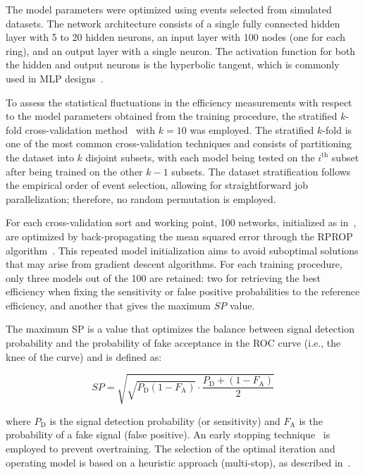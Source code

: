 The model parameters were optimized using events selected from simulated \Zee datasets. The network architecture consists of a single fully connected hidden layer with 5 to 20 hidden neurons, an input layer with 100 nodes (one for each ring), and an output layer with a single neuron.
The activation function for both the hidden and output neurons is the hyperbolic tangent, which is commonly used in MLP designs~\cite{haykin_2008}.


To assess the statistical fluctuations in the efficiency measurements with respect to the model parameters obtained from the training procedure, the stratified $k$-fold cross-validation method~\cite{haykin_2008} with $k=10$ was employed. The stratified $k$-fold is one of the most common cross-validation techniques and consists of partitioning the dataset into $k$ disjoint subsets, with each model being tested on the $i^\text{th}$ subset after being trained on the other $k-1$ subsets. The dataset stratification follows the empirical order of event selection, allowing for straightforward job parallelization; therefore, no random permutation is employed. 

For each cross-validation sort and working point, 100 networks, initialized as in~\cite{initnw}, are optimized by back-propagating the mean squared error through the RPROP algorithm~\cite{rprop}. This repeated model initialization aims to avoid suboptimal solutions that may arise from gradient descent algorithms.
For each training procedure, only three models out of the 100 are retained: two for retrieving the best efficiency when fixing the sensitivity or false positive probabilities to the reference \fastcalo{} efficiency, and another that gives the maximum $SP$ value. 

The maximum SP is a value that optimizes the balance between signal detection probability and the probability of fake acceptance in the ROC curve (i.e., the knee of the curve) and is defined as:

\begin{equation*}
SP = \sqrt{\sqrt{P_\text{D}(1-F_\text{A})}\cdot\frac{P_\text{D} + (1-F_\text{A})}{2}}
\end{equation*}


\noindent where $P_\text{D}$ is the signal detection probability (or sensitivity) and $F_\text{A}$ is the probability of a fake signal (false positive). 
An early stopping technique~\cite{haykin_2008} is employed to prevent overtraining. The selection of the optimal iteration and operating model is based on a heuristic approach (multi-stop), as described in~\cite{Goodfellow2016}.

